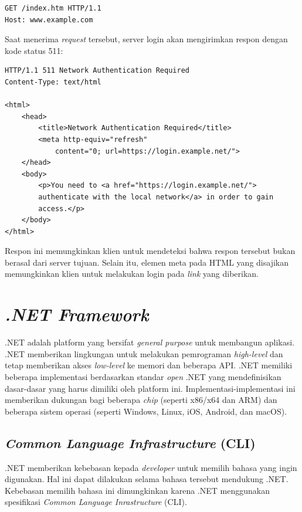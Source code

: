 \begin{lstlisting}
GET /index.htm HTTP/1.1
Host: www.example.com
\end{lstlisting}

Saat menerima \textit{request} tersebut, server login akan mengirimkan respon dengan kode status 511:

\begin{lstlisting}
HTTP/1.1 511 Network Authentication Required
Content-Type: text/html

<html>
    <head>
        <title>Network Authentication Required</title>
        <meta http-equiv="refresh"
            content="0; url=https://login.example.net/">
    </head>
    <body>
        <p>You need to <a href="https://login.example.net/">
        authenticate with the local network</a> in order to gain
        access.</p>
    </body>
</html>
\end{lstlisting}

Respon ini memungkinkan klien untuk mendeteksi bahwa respon tersebut bukan berasal dari server tujuan. Selain itu, elemen meta pada HTML yang disajikan memungkinkan klien untuk melakukan login pada \textit{link} yang diberikan.



\section{\textit{.NET Framework}}
\label{sec:net_framework}

.NET adalah platform yang bersifat \textit{general purpose} untuk membangun aplikasi\cite{NET_PRIMER:2016}. .NET memberikan lingkungan untuk melakukan pemrograman \textit{high-level} dan tetap memberikan akses \textit{low-level} ke memori dan beberapa API. .NET memiliki beberapa implementasi berdasarkan standar \textit{open} .NET yang mendefinisikan dasar-dasar yang harus dimiliki oleh platform ini. Implementasi-implementasi ini memberikan dukungan bagi beberapa \textit{chip} (seperti x86/x64 dan ARM) dan beberapa sistem operasi (seperti Windows, Linux, iOS, Android, dan macOS).

\subsection{\textit{Common Language Infrastructure} (CLI)}
\label{subsec:cli}

.NET memberikan kebebasan kepada \textit{developer} untuk memilih bahasa yang ingin digunakan. Hal ini dapat dilakukan selama bahasa tersebut mendukung .NET. Kebebasan memilih bahasa ini dimungkinkan karena .NET menggunakan spesifikasi \textit{Common Language Inrastructure} (CLI).

